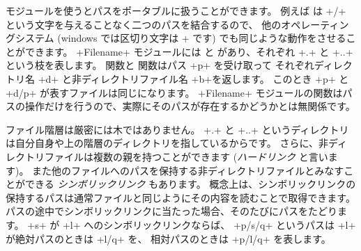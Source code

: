  モジュールを使うとパスをポータブルに扱うことができます。
例えば  は \ml+/+ という文字を与えることなく二つのパスを結合するので、
他のオペレーティングシステム (windows では区切り文字は \ml+\+ です) でも同じような動作をさせることができます。
\ml+Filename+ モジュールには  と
 があり、それぞれ \ml+.+ と \ml+..+ という枝を表します。
 関数と  関数はパス \ml+p+ を受け取って
それぞれディレクトリ名 \ml+d+ と非ディレクトリファイル名 \ml+b+を返します。
このとき \ml+p+ と \ml+d/p+ が表すファイルは同じになります。
\ml+Filename+ モジュールの関数はパスの操作だけを行うので、実際にそのパスが存在するかどうかとは無関係です。

ファイル階層は厳密には木ではありません。
\ml+.+ と \ml+..+ というディレクトリは自分自身や上の階層のディレクトリを指しているからです。
さらに、非ディレクトリファイルは複数の親を持つことができます (\emph{ハードリンク} と言います)。
また他のファイルへのパスを保持する非ディレクトリファイルとみなすことができる \emph{シンボリックリンク} もあります。
概念上は、シンボリックリンクの保持するパスは通常ファイルと同じようにその内容を読むことで取得できます。
パスの途中でシンボリックリンクに当たった場合、そのたびにパスをたどります。
\ml+s+ が \ml+l+ へのシンボリックリンクならば、 \ml+p/s/q+ というパスは \ml+l+ が絶対パスのときは \ml+l/q+ を、
相対パスのときは \ml+p/l/q+ を表します。

